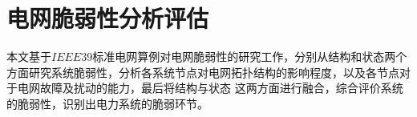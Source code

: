 





\section{电网脆弱性分析评估}
\label{sec:singleAssessment}

本文基于$IEEE39$标准电网算例对电网脆弱性的研究工作，分别从结构和状态两个方面研究系统脆弱性，分析各系统节点对电网拓扑结构的影响程度，以及各节点对于电网故障及扰动的能力，最后将结构与状态
这两方面进行融合，综合评价系统的脆弱性，识别出电力系统的脆弱环节。

